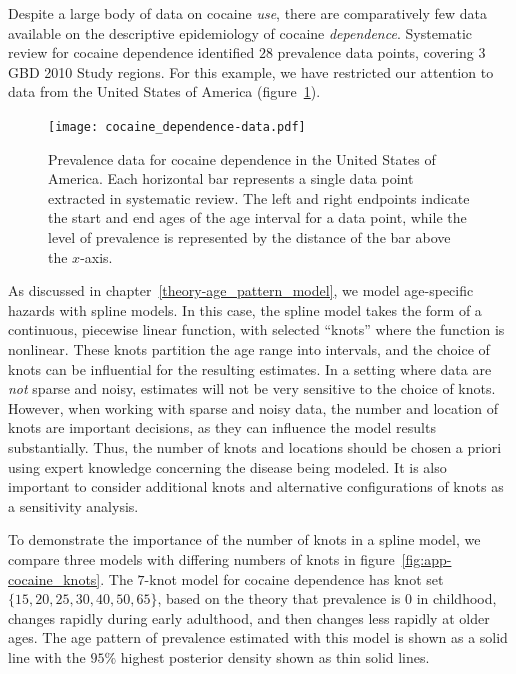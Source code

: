 Despite a large body of data on cocaine \emph{use}, there are comparatively few
data available on the descriptive epidemiology of cocaine
\emph{dependence}.\cite{degenhardt_what_2011} Systematic review for cocaine
dependence identified $28$ prevalence data points,
covering $3$ GBD 2010 Study regions.  For this example, we have restricted our attention
to data from the United States of America (figure~\ref{fig:app-cocaine_data}).

    \begin{figure}[h]
        \begin{center}
            \texttt{[image: cocaine\_dependence-data.pdf]}
            \caption[Systematic review data for cocaine dependence.]{Prevalence 
              data for cocaine dependence in the
              United States of America. Each horizontal bar represents
              a single data point extracted in systematic review.  The
              left and right endpoints indicate the start and end ages
              of the age interval for a data point, while the level of
              prevalence is represented by the distance of the bar
              above the $x$-axis.}
            \label{fig:app-cocaine_data}
        \end{center}
    \end{figure}

As discussed in chapter~\ref{theory-age_pattern_model}, we model
age-specific hazards with spline models.  In this
case, the spline model takes the form of a continuous, piecewise
linear function, with selected ``knots'' where the function is nonlinear.
These knots partition the age range
into intervals, and the choice of knots can be influential for the
resulting estimates.  In a setting where data are \emph{not} sparse and
noisy, estimates will not be very sensitive to the choice of knots.
However, when working with sparse and noisy data, the number and
location of knots are important decisions, as they can influence the
model results substantially.  Thus, the number of knots and locations
should be chosen a priori using expert knowledge concerning the
disease being modeled.  It is also
important to consider additional knots and alternative configurations
of knots as a sensitivity analysis.

To demonstrate the importance of the number of knots in a spline
model, we compare three models with differing numbers of knots in
figure~\ref{fig:app-cocaine_knots}.  The $7$-knot model for cocaine
dependence has knot set $\{15, 20, 25, 30, 40, 50, 65\}$, based on the theory that prevalence is $0$ in childhood,
changes rapidly during early adulthood, and then changes less rapidly
at older ages.  The age pattern of prevalence estimated with this
model is shown as a solid line with the $95\%$ highest posterior
density shown as thin solid lines.

